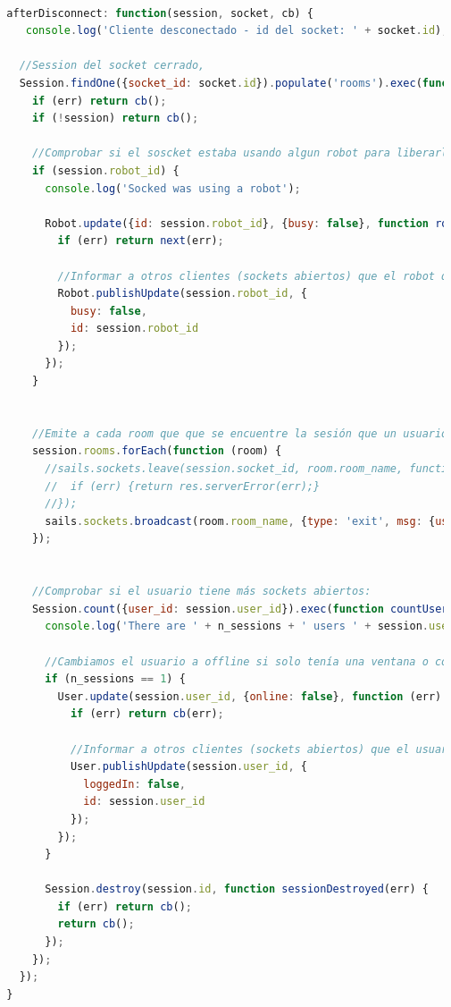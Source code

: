 \begin{lstlisting}[language=JavaScript]

  afterDisconnect: function(session, socket, cb) {
     console.log('Cliente desconectado - id del socket: ' + socket.id);

    //Session del socket cerrado,
    Session.findOne({socket_id: socket.id}).populate('rooms').exec(function (err, session) {
      if (err) return cb();
      if (!session) return cb();

      //Comprobar si el soscket estaba usando algun robot para liberarlo:
      if (session.robot_id) {
        console.log('Socked was using a robot');

        Robot.update({id: session.robot_id}, {busy: false}, function robotUpdated(err) {
          if (err) return next(err);

          //Informar a otros clientes (sockets abiertos) que el robot queda liberado
          Robot.publishUpdate(session.robot_id, {
            busy: false,
            id: session.robot_id
          });
        });
      }


      //Emite a cada room que que se encuentre la sesión que un usuario la ha abandonado ->  
      session.rooms.forEach(function (room) {
        //sails.sockets.leave(session.socket_id, room.room_name, function(err) {
        //  if (err) {return res.serverError(err);}
        //});
        sails.sockets.broadcast(room.room_name, {type: 'exit', msg: {user_id: session.user_id}});
      });


      //Comprobar si el usuario tiene más sockets abiertos:
      Session.count({user_id: session.user_id}).exec(function countUserSessions(error, n_sessions) {
        console.log('There are ' + n_sessions + ' users ' + session.user_id);

        //Cambiamos el usuario a offline si solo tenía una ventana o conexión abierta.
        if (n_sessions == 1) {
          User.update(session.user_id, {online: false}, function (err) {
            if (err) return cb(err);

            //Informar a otros clientes (sockets abiertos) que el usuario ya NO se encuentra logueado
            User.publishUpdate(session.user_id, {
              loggedIn: false,
              id: session.user_id
            });
          });
        }

        Session.destroy(session.id, function sessionDestroyed(err) {
          if (err) return cb();
          return cb();
        });
      });
    });
  }

\end{lstlisting}
 